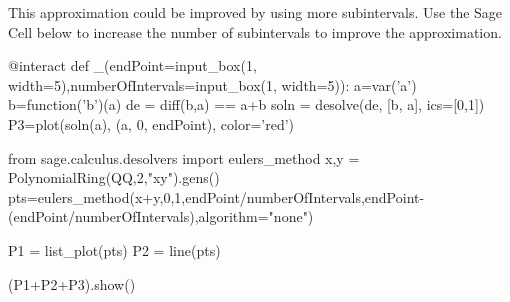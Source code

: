 \documentclass{ximera}
\begin{document}
\begin{example}
\begin{image}
\end{image}


This approximation could be improved by using more subintervals.  Use the Sage Cell below to increase the number of subintervals to improve the approximation.

\begin{sageCell}%
@interact
def _(endPoint=input_box(1, width=5),numberOfIntervals=input_box(1, width=5)):
    a=var('a')
    b=function('b')(a)
    de = diff(b,a) ==  a+b
    soln = desolve(de, [b, a], ics=[0,1])
    P3=plot(soln(a), (a, 0, endPoint), color='red')

    from sage.calculus.desolvers import eulers_method
    x,y = PolynomialRing(QQ,2,"xy").gens()
    pts=eulers_method(x+y,0,1,endPoint/numberOfIntervals,endPoint-(endPoint/numberOfIntervals),algorithm="none")

    P1 = list_plot(pts)
    P2 = line(pts)

    (P1+P2+P3).show()
\end{sageCell}

\end{example}
\end{document}
